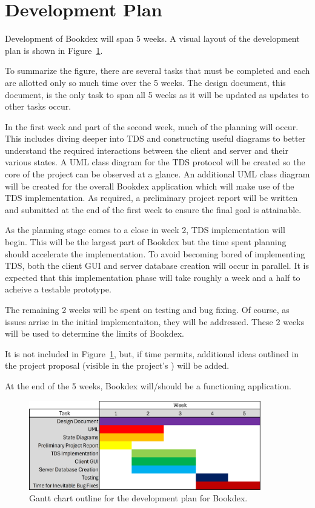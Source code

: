 \documentclass[../design_doc.tex]{subfiles}
\begin{document}
\section{Development Plan}\label{sec:plan}
    Development of Bookdex will span 5 weeks. A visual layout of the development plan is shown in Figure~\ref{fig:gantt}.

    To summarize the figure, there are several tasks that must be completed and each are allotted only so much time over the 5 weeks. The design document, this document, is the only task to span all 5 weeks as it will be updated as updates to other tasks occur.

    In the first week and part of the second week, much of the planning will occur. This includes diving deeper into TDS and constructing useful diagrams to better understand the required interactions between the client and server and their various states. A UML class diagram for the TDS protocol will be created so the core of the project can be observed at a glance. An additional UML class diagram will be created for the overall Bookdex application which will make use of the TDS implementation. As required, a preliminary project report will be written and submitted at the end of the first week to ensure the final goal is attainable.

    As the planning stage comes to a close in week 2, TDS implementation will begin. This will be the largest part of Bookdex but the time spent planning should accelerate the implementation. To avoid becoming bored of implementing TDS, both the client GUI and server database creation will occur in parallel. It is expected that this implementation phase will take roughly a week and a half to acheive a testable prototype.

    The remaining 2 weeks will be spent on testing and bug fixing. Of course, as issues arrise in the initial implementaiton, they will be addressed. These 2 weeks will be used to determine the limits of Bookdex.

    It is not included in Figure~\ref{fig:gantt}, but, if time permits, additional ideas outlined in the project proposal (visible in the project's ) will be added.

    At the end of the 5 weeks, Bookdex will/should be a functioning application.

    \begin{figure}
        \centering
        \includegraphics[width=0.9\textwidth]{gantt_chart.png}
        \caption{Gantt chart outline for the development plan for Bookdex.}\label{fig:gantt}
    \end{figure}
\end{document}
